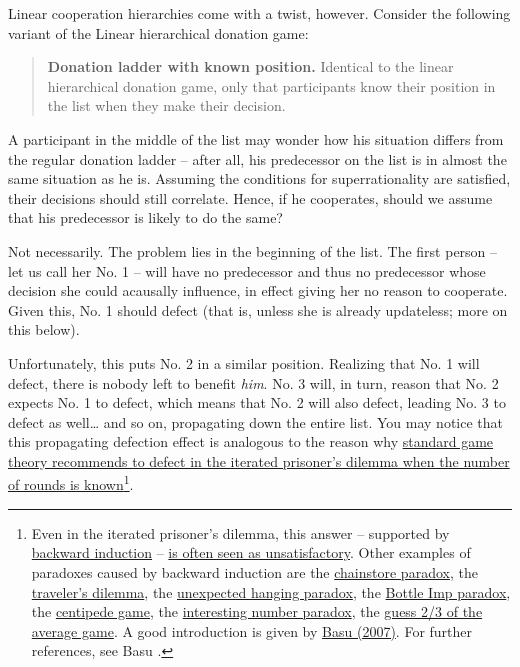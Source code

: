 Linear cooperation hierarchies come with a twist, however. Consider the
following variant of the Linear hierarchical donation game:

\begin{quote}
\textbf{Donation ladder with known position.} Identical to the linear
hierarchical donation game, only that participants know their position
in the list when they make their decision.
\end{quote}

A participant in the middle of the list may wonder how his situation
differs from the regular donation ladder -- after all, his predecessor
on the list is in almost the same situation as he is. Assuming the
conditions for superrationality are satisfied, their decisions should
still correlate. Hence, if he cooperates, should we assume that his
predecessor is likely to do the same?

Not necessarily. The problem lies in the beginning of the list. The
first person -- let us call her No. 1 -- will have no predecessor and
thus no predecessor whose decision she could acausally influence, in
effect giving her no reason to cooperate. Given this, No. 1 should
defect (that is, unless she is already updateless; more on this below).

Unfortunately, this puts No. 2 in a similar position. Realizing that No.
1 will defect, there is nobody left to benefit \emph{him}. No. 3 will,
in turn, reason that No. 2 expects No. 1 to defect, which means that No.
2 will also defect, leading No. 3 to defect as well\ldots{} and so on,
propagating down the entire list. You may notice that this propagating
defection effect is analogous to the reason why
\href{https://en.wikipedia.org/wiki/Prisoner\%27s_dilemma\#The_iterated_prisoner.27s_dilemma}{standard
game theory recommends to defect in the iterated prisoner's dilemma when
the number of rounds is known}\footnote{Even in the iterated prisoner's
  dilemma, this answer -- supported by
  \href{https://en.wikipedia.org/wiki/Backward_induction}{backward
  induction} --
  \href{http://lesswrong.com/lw/to/the_truly_iterated_prisoners_dilemma/n23}{is
  often seen as unsatisfactory}. Other examples of paradoxes caused by
  backward induction are the
  \href{https://en.wikipedia.org/wiki/Chainstore_paradox}{chainstore
  paradox}, the
  \href{https://en.wikipedia.org/wiki/Traveler\%27s_dilemma}{traveler's
  dilemma}, the
  \href{https://en.wikipedia.org/wiki/Unexpected_hanging_paradox}{unexpected
  hanging paradox}, the
  \href{https://en.wikipedia.org/wiki/The_Bottle_Imp\#Bottle_Imp_paradox}{Bottle
  Imp paradox}, the
  \href{https://en.wikipedia.org/wiki/Centipede_game}{centipede
  game}, the
  \href{https://en.wikipedia.org/wiki/Interesting_number_paradox}{interesting
  number paradox}, the
  \href{https://en.wikipedia.org/wiki/Guess_2/3_of_the_average}{guess
  2/3 of the average game}. A good introduction is given by
  \href{http://www.cs.virginia.edu/~robins/The_Travelers_Dilemma.pdf}{Basu
  (2007)}. For further references, see Basu \citeyear{Basu1994-xk}.}.

